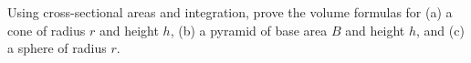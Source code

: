 Using cross-sectional areas and integration, prove the volume formulas for (a) a cone of radius $r$ and height $h$, (b) a pyramid of base area $B$ and height $h$, and (c) a sphere of radius $r$.
